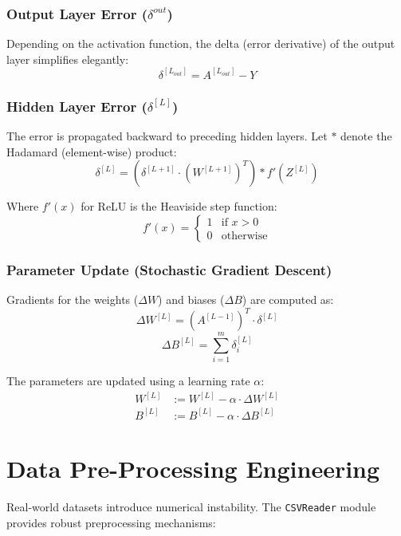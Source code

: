 \documentclass[11pt, a4paper]{article}
\begin{document}
\subsubsection{Output Layer Error ($\delta^{out}$)}
Depending on the activation function, the delta (error derivative) of the output layer simplifies elegantly:
\begin{equation}
\delta^{[L_{out}]} = A^{[L_{out}]} - Y
\end{equation}

\subsubsection{Hidden Layer Error ($\delta^{[L]}$)}
The error is propagated backward to preceding hidden layers. Let $*$ denote the Hadamard (element-wise) product:
\begin{equation}
\delta^{[L]} = (\delta^{[L+1]} \cdot (W^{[L+1]})^T) * f'(Z^{[L]})
\end{equation}

Where $f'(x)$ for ReLU is the Heaviside step function:
\begin{equation}
f'(x) = 
\begin{cases} 
1 & \text{if } x > 0 \\ 
0 & \text{otherwise} 
\end{cases}
\end{equation}

\subsubsection{Parameter Update (Stochastic Gradient Descent)}
Gradients for the weights ($\Delta W$) and biases ($\Delta B$) are computed as:
\begin{equation}
\Delta W^{[L]} = (A^{[L-1]})^T \cdot \delta^{[L]}
\end{equation}
\begin{equation}
\Delta B^{[L]} = \sum_{i=1}^{m} \delta^{[L]}_{i}
\end{equation}

The parameters are updated using a learning rate $\alpha$:
\begin{align}
W^{[L]} &:= W^{[L]} - \alpha \cdot \Delta W^{[L]} \\
B^{[L]} &:= B^{[L]} - \alpha \cdot \Delta B^{[L]}
\end{align}

\section{Data Pre-Processing Engineering}
Real-world datasets introduce numerical instability. The \texttt{CSVReader} module provides robust preprocessing mechanisms:
\end{document}
